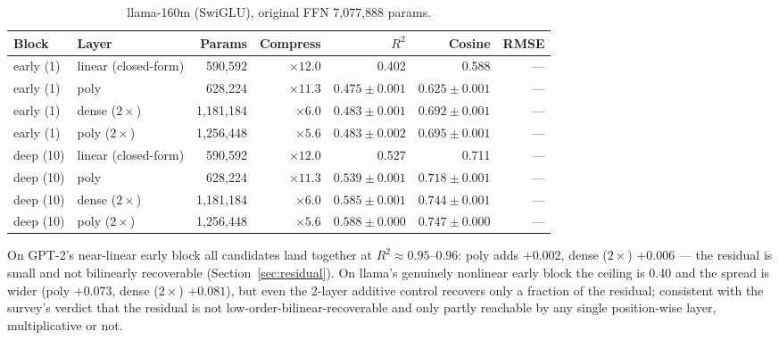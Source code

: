 \documentclass{article}
\begin{document}
\begin{table}[t]
  \centering
  \small
  \setlength{\tabcolsep}{5pt}
  \caption{llama-160m (SwiGLU), original FFN 7{,}077{,}888 params.}
  \label{tab:fidelity-llama}
  \begin{tabular}{llrrrrr}
    \toprule
    Block & Layer & Params & Compress & $R^2$ & Cosine & RMSE \\
    \midrule
    early (1) & linear (closed-form) & 590{,}592   & $\times 12.0$ & 0.402 & 0.588 & --- \\
    early (1) & poly                 & 628{,}224   & $\times 11.3$ & $0.475 \pm 0.001$ & $0.625 \pm 0.001$ & --- \\
    early (1) & dense ($2\times$)    & 1{,}181{,}184 & $\times 6.0$  & $0.483 \pm 0.001$ & $0.692 \pm 0.001$ & --- \\
    early (1) & poly ($2\times$)     & 1{,}256{,}448 & $\times 5.6$  & $0.483 \pm 0.002$ & $0.695 \pm 0.001$ & --- \\
    deep (10) & linear (closed-form) & 590{,}592   & $\times 12.0$ & 0.527 & 0.711 & --- \\
    deep (10) & poly                 & 628{,}224   & $\times 11.3$ & $0.539 \pm 0.001$ & $0.718 \pm 0.001$ & --- \\
    deep (10) & dense ($2\times$)    & 1{,}181{,}184 & $\times 6.0$  & $0.585 \pm 0.001$ & $0.744 \pm 0.001$ & --- \\
    deep (10) & poly ($2\times$)     & 1{,}256{,}448 & $\times 5.6$  & $0.588 \pm 0.000$ & $0.747 \pm 0.000$ & --- \\
    \bottomrule
  \end{tabular}
\end{table}

On GPT-2's near-linear early block all candidates land together at $R^2 \approx 0.95$--$0.96$:
poly adds $+0.002$, dense ($2\times$) $+0.006$ --- the residual is small and not bilinearly
recoverable (Section~\ref{sec:residual}). On llama's genuinely nonlinear early block the ceiling
is 0.40 and the spread is wider (poly $+0.073$, dense ($2\times$) $+0.081$), but even the 2-layer
additive control recovers only a fraction of the residual; consistent with the survey's
verdict that the residual is not low-order-bilinear-recoverable and only partly reachable by
any single position-wise layer, multiplicative or not.
\end{document}
